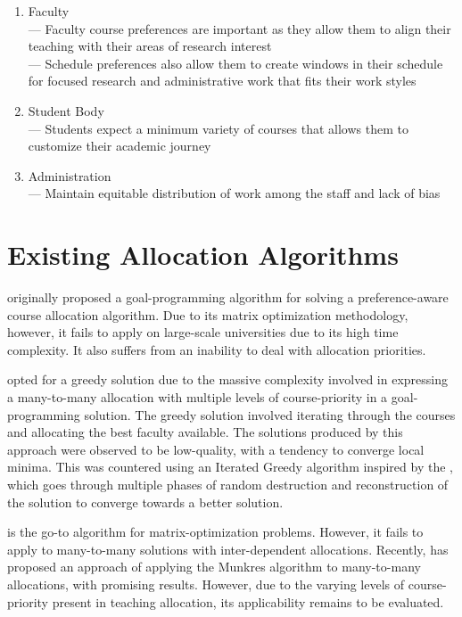 \begin{enumerate}
    \item Faculty\\
          — Faculty course preferences are important as they allow them to align their teaching with their areas of research interest\\
          — Schedule preferences also allow them to create windows in their schedule for focused research and administrative work that fits their work styles
    \item Student Body\\
          — Students expect a minimum variety of courses that allows them to customize their academic journey
    \item Administration\\
          — Maintain equitable distribution of work among the staff and lack of bias
\end{enumerate}

\section{Existing Allocation Algorithms}

\cite{schniederjans1987goal} originally proposed a goal-programming algorithm for solving a preference-aware course allocation algorithm. Due to its matrix optimization methodology, however, it fails to apply on large-scale universities due to its high time complexity. It also suffers from an inability to deal with allocation priorities.

\cite{rohan2017} opted for a greedy solution due to the massive complexity involved in expressing a many-to-many allocation with multiple levels of course-priority in a goal-programming solution. The greedy solution involved iterating through the courses and allocating the best faculty available. The solutions produced by this approach were observed to be low-quality, with a tendency to converge local minima. This was countered using an Iterated Greedy algorithm inspired by the \cite{ruiz2007simple}, which goes through multiple phases of random destruction and reconstruction of the solution to converge towards a better solution.

\cite{munkres1957algorithms} is the go-to algorithm for matrix-optimization problems. However, it fails to apply to many-to-many solutions with inter-dependent allocations. Recently, \cite{zhu2016solving} has proposed an approach of applying the Munkres algorithm to many-to-many allocations, with promising results. However, due to the varying levels of course-priority present in teaching allocation, its applicability remains to be evaluated.

